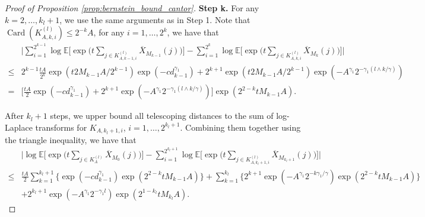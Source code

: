 \documentclass[11pt]{article}
\DeclareMathOperator*{\card}{Card}
\theoremstyle{plain}
\theoremstyle{definition}
\begin{document}
\begin{proof}[Proof of Proposition \ref{prop:bernstein_bound_cantor}]
    \textbf{Step k.} For any $k = 2, \dots, k_l+1$, we use the same arguments as in Step 1. Note that $\card(K_{A,k,i}^{(l)}) \leq 2^{-k}A$, for any $i = 1, \dots, 2^k$, we have that
    \begin{equation*}
    \begin{aligned}
        &\Big|\sum_{i = 1}^{2^{k-1}}\log\mathbb{E}\Big[\exp\Big(t\sum_{j \in K_{A, k-1,i}^{(l)}}\overline{X}_{M_{k-1}}(j)\Big)\Big] - \sum_{i=1}^{2^k}\log\mathbb{E}\Big[\exp\Big( t\sum_{j \in K_{A,k,i}^{(l)}}\overline{X}_{M_k}(j) \Big)\Big]\Big|\\
        \leq& 2^{k-1}\frac{tA}{2^k}\exp(t2M_{k-1}A/2^{k-1})\exp(-cd_{k-1}^{\gamma_1}) + 2^{k+1}\exp(t2M_{k-1}A/2^{k-1})\exp(-A^{\gamma_1}2^{-\gamma_1(l \wedge k/\gamma)})\\
        =& \Big[\frac{tA}{2}\exp(-cd_{k-1}^{\gamma_1}) + 2^{k+1}\exp(-A^{\gamma_1}2^{-\gamma_1(l \wedge k/\gamma)})\Big]\exp(2^{2-k}tM_{k-1}A).
    \end{aligned}
    \end{equation*}

    After $k_l+1$ steps, we upper bound all telescoping distances to the sum of log-Laplace transforms for $K_{A,k_l+1,i}$, $i = 1, \dots, 2^{k_l+1}$. Combining them together using the triangle inequality, we have that
    \begin{align}\label{eq:together_stepkl}
        &\Big|\log\mathbb{E}\Big[\exp\Big(t\sum_{j \in K_{A}^{(l)}}\overline{X}_{M_0}(j)\Big)\Big] - \sum_{i=1}^{2^{k_l+1}}\log\mathbb{E}\Big[\exp\Big( t\sum_{j \in K_{A,k_l+1,i}^{(l)}}\overline{X}_{M_{k_l+1}}(j) \Big)\Big]\Big| \nonumber \\
        \leq& \frac{tA}{2}\sum_{k = 1}^{k_l+1}\big\{\exp(-cd_{k-1}^{\gamma_1})\exp(2^{2-k}tM_{k-1}A)\big\}+ \sum_{k = 1}^{k_l}\big\{2^{k+1}\exp(-A^{\gamma_1}2^{-k\gamma_1/\gamma})\exp(2^{2-k}tM_{k-1}A)\big\}\nonumber \\
        &+ 2^{k_l+1}\exp(-A^{\gamma_1}2^{-\gamma_1l})\exp(2^{1-k_l}tM_{k_l}A).
    \end{align} 
    
        
    

\end{proof}
\end{document}
